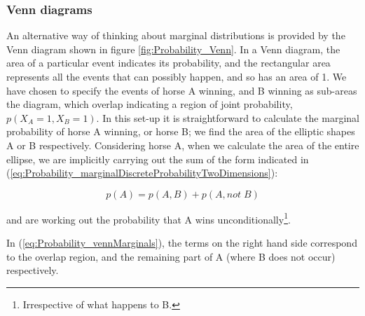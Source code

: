 \documentclass[11pt,fullpage]{book}
\begin{document}
\subsubsection{Venn diagrams}
An alternative way of thinking about marginal distributions is provided by the Venn diagram shown in figure \ref{fig:Probability_Venn}. In a Venn diagram, the area of a particular event indicates its probability, and the rectangular area represents all the events that can possibly happen, and so has an area of 1. We have chosen to specify the events of horse A winning, and B winning as sub-areas the diagram, which overlap indicating a region of joint probability, $p(X_A=1,X_B=1)$. In this set-up it is straightforward to calculate the marginal probability of horse A winning, or horse B; we find the area of the elliptic shapes A or B respectively. Considering horse A, when we calculate the area of the entire ellipse, we are implicitly carrying out the sum of the form indicated in (\ref{eq:Probability_marginalDiscreteProbabilityTwoDimensions}):

\begin{equation}\label{eq:Probability_vennMarginals}
p(A) = p(A,B) + p(A,not\; B)
\end{equation}

and are working out the probability that A wins unconditionally\footnote{Irrespective of what happens to B.}.

In (\ref{eq:Probability_vennMarginals}), the terms on the right hand side correspond to the overlap region, and the remaining part of A (where B does not occur) respectively.
\end{document}
